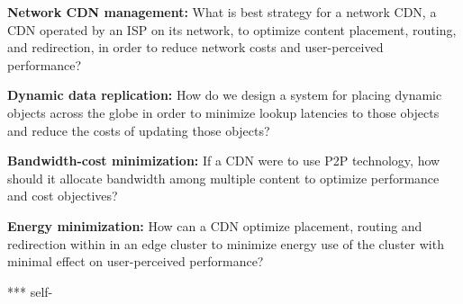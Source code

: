 \begin{enumerate}
\textbf{Network CDN management:}
What is best strategy for a network CDN, a CDN operated by an ISP on its network, to optimize content placement, routing, and redirection, in order to reduce network costs and user-perceived performance?

\textbf{Dynamic data replication:}
How do we design a system for placing dynamic objects across the globe in order to minimize lookup latencies to those objects and reduce the costs of updating those objects?

\textbf{Bandwidth-cost minimization:}
If a CDN were to use P2P technology, how should it allocate bandwidth among multiple content to optimize performance and cost objectives?


\textbf{Energy minimization:}
How can a CDN optimize placement, routing and redirection within in an edge cluster to minimize energy use of the cluster with minimal effect on user-perceived performance? 

*** self-












\end{enumerate}
